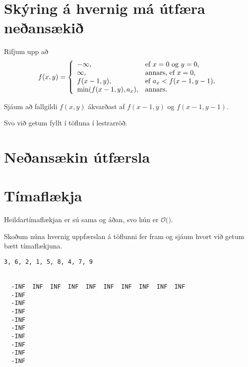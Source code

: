 \section{Skýring á hvernig má útfæra neðansækið}
{
    {
        \item<1-> Rifjum upp að
        \[
            f(x, y) = \left \{
            \env{array}
            { {l l}
                -\infty, & \text{ef $x = 0$ og $y = 0$,} \\
                \infty, & \text{annars, ef $x = 0$,} \\
                f(x - 1, y), & \text{ef $a_x < f(x - 1, y - 1)$,} \\
                \min(f(x - 1, y), a_x), & \text{annars.}
            }
            \right .
        \]
        \item<2-> Sjáum að fallgildi $f(x, y)$ ákvarðast af $f(x - 1, y)$ og $f(x - 1, y - 1)$.
        \item<3-> Svo við getum fyllt í töfluna í lestrarröð.
    }
}

\section{Neðansækin útfærsla}
{
}

\section{Tímaflækja}
{
    {
        \item<1-> Heildartímaflækjan er sú sama og áðan, svo hún er $\mathcal{O}($$)$.
        \item<3-> Skoðum núna hvernig uppfærslan á töflunni fer fram og sjáum hvort við getum bætt tímaflækjuna.
    }
}

{ \begin{verbatim}
3, 6, 2, 1, 5, 8, 4, 7, 9


  -INF  INF  INF  INF  INF  INF  INF  INF  INF  INF
  -INF                                             
  -INF                                             
  -INF                                             
  -INF                                             
  -INF                                             
  -INF                                             
  -INF                                             
  -INF                                             
  -INF                                             
\end{verbatim} }

